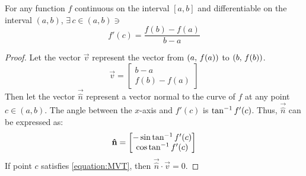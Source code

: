 \begin{lemma}\label{lemma:MVT}
	For any function $f$ continuous on the interval $[a,b]$ and differentiable on the interval $(a,b)$,
	$\exists\,c\in(a,b)\ni$
	\begin{equation}\label{equation:MVT}
		f'(c)=\frac{f(b)-f(a)}{b-a}
	\end{equation}
	\begin{proof}
		Let the vector $\vec{v}$ represent the vector from $\left(a,\,f(a)\right)$ to $\left(b,\,f(b)\right)$.
		$$
			\vec{v}=\begin{bmatrix}
				b-a\\
				f(b)-f(a)
			\end{bmatrix}
		$$
		Then let the vector $\vec{\hat{n}}$ represent a vector normal to the curve of $f$ at any point $c\in(a,b)$.
		The angle between the $x$-axis and $f'(c)$ is $\tan^{-1} f'(c)$. Thus, $\vec{\hat{n}}$ can be expressed as:
		$$
			\mathbf{\hat{n}}=\begin{bmatrix}
				-\sin\tan^{-1} f'(c)\\
				\cos\tan^{-1} f'(c)
			\end{bmatrix}
		$$
		If point $c$ satisfies \eqref{equation:MVT}, then $\vec{\hat{n}}\cdot\vec{v}=0$.
	\end{proof}
\end{lemma}

